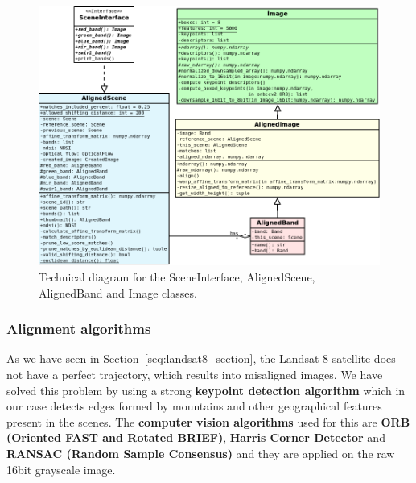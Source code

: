 \documentclass[12pt, a4paper]{report}
\begin{document}
	\begin{figure}[h!]
		\centering
		\includegraphics[scale=0.45]{../images/alignment_diagram.png}
		\caption{Technical diagram for the SceneInterface, AlignedScene, AlignedBand and Image classes.}
		\label{fig:alignment_diagram}
	\end{figure}

	\subsubsection{Alignment algorithms}
	\label{seq:alignment_algorithm}
	
	\par As we have seen in Section~\ref{seq:landsat8_section}, the Landsat 8 satellite does not have a perfect trajectory, which results into misaligned images. We have solved this problem by using a strong \textbf{keypoint detection algorithm} which in our case detects edges formed by mountains and other geographical features present in the scenes. The \textbf{computer vision algorithms} used for this are \textbf{ORB (Oriented FAST and Rotated BRIEF)}, \textbf{Harris Corner Detector} and \textbf{RANSAC (Random Sample Consensus)} and they are applied on the raw 16bit grayscale image.
	
\end{document}
